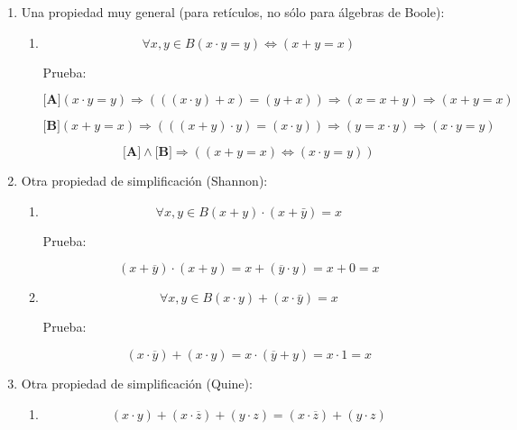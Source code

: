 \documentclass[
]{article}
\begin{document}
\begin{enumerate}
\begin{enumerate}
\begin{enumerate}
\begin{enumerate}
        Prueba:

        \[{{{{x \cdot {({x + y})}} = {{({x + 0})} \cdot {({x + y})}}} = {x + {({0 \cdot y})}}} = {x + 0}} = x\]
      \end{enumerate}
    \item
      Una propiedad muy general (para retículos, no sólo para álgebras
      de Boole):

      \begin{enumerate}
      \def\labelenumiv{\arabic{enumiv}.}
      \item
        \[\forall x,{y \in B}{({{x \cdot y} = y})}\Leftrightarrow{({{x + y} = x})}\]

        Prueba:

        \[{\lbrack\mathbf{A}\rbrack}{({{x \cdot y} = y})}\Rightarrow{({{({{({x \cdot y})} + x})} = {({y + x})}})}\Rightarrow{({x = {x + y}})}\Rightarrow{({{x + y} = x})}\]

        \[{\lbrack\mathbf{B}\rbrack}{({{x + y} = x})}\Rightarrow{({{({{({x + y})} \cdot y})} = {({x \cdot y})}})}\Rightarrow{({y = {x \cdot y}})}\Rightarrow{({{x \cdot y} = y})}\]

        \[{{\lbrack\mathbf{A}\rbrack} \land {\lbrack\mathbf{B}\rbrack}}\Rightarrow{({{({{x + y} = x})}\Leftrightarrow{({{x \cdot y} = y})}})}\]
      \end{enumerate}
    \item
      Otra propiedad de simplificación (Shannon):

      \begin{enumerate}
      \def\labelenumiv{\arabic{enumiv}.}
      \item
        \[\forall x,{y \in B}{{{({x + y})} \cdot {({x + \bar{y}})}} = x}\]

        Prueba:

        \[{{{{({x + \overline{y}})} \cdot {({x + y})}} = {x + {({\overline{y} \cdot y})}}} = {x + 0}} = x\]
      \item
        \[\forall x,{y \in B}{{{({x \cdot y})} + {({x \cdot \bar{y}})}} = x}\]

        Prueba:

        \[{{{{({x \cdot \overline{y}})} + {({x \cdot y})}} = {x \cdot {({\overline{y} + y})}}} = {x \cdot 1}} = x\]
      \end{enumerate}
    \item
      Otra propiedad de simplificación (Quine):

      \begin{enumerate}
      \def\labelenumiv{\arabic{enumiv}.}
      \item
        \[{{\left( {x \cdot y} \right) + \left( {x \cdot \overline{z}} \right)} + \left( {y \cdot z} \right)} = {\left( {x \cdot \overline{z}} \right) + \left( {y \cdot z} \right)}\]


\end{enumerate}
\end{enumerate}
\end{enumerate}
\end{enumerate}
\end{document}
